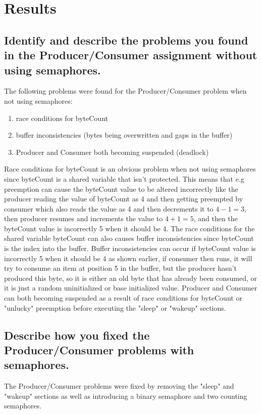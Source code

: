 \section{Results}
\label{section:results}

\subsection{Identify and describe the problems you found in the Producer/Consumer assignment without using semaphores.}
The following problems were found for the Producer/Consumer problem when not using semaphores:
\begin{enumerate}
    \item race conditions for byteCount
    \item buffer inconsistencies (bytes being overwritten and gaps in the buffer)
    \item Producer and Consumer both becoming suspended (deadlock)
\end{enumerate}

Race conditions for byteCount is an obvious problem when not using semaphores since byteCount is a shared variable that isn't protected. This means that e.g preemption can cause the byteCount value to be altered incorrectly like the producer reading the value of byteCount as 4 and then getting preempted by consumer which also reads the value as 4 and then decrements it to $4-1 = 3$, then producer resumes and increments the value to $4+1 = 5$, and then the byteCount value is incorrectly 5 when it should be 4. The race conditions for the shared variable byteCount can also causes buffer inconsistencies since byteCount is the index into the buffer. 
Buffer inconsistencies can occur if byteCount value is incorrectly 5 when it should be 4 as shown earlier, if consumer then runs, it will try to consume an item at position 5 in the buffer, but the producer hasn't produced this byte, so it is either an old byte that has already been consumed, or it is just a random uninitialized or base initialized value.
Producer and Consumer can both becoming suspended as a result of race conditions for byteCount or "unlucky" preemption before executing the "sleep" or "wakeup" sections.

\subsection{Describe how you fixed the Producer/Consumer problems with semaphores.}
The Producer/Consumer problems were fixed by removing the "sleep" and "wakeup" sections as well as introducing a binary semaphore and two counting semaphores. 

